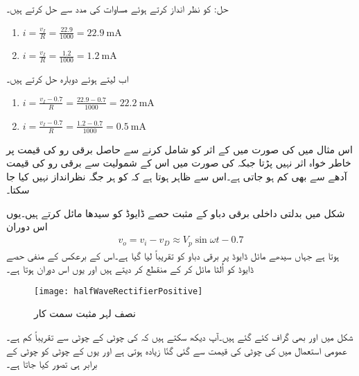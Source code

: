 حل:	 کو نظر انداز کرتے ہوئے مساوات   کی مدد سے حل کرتے ہیں۔
\begin{enumerate}
\item
$i=\frac{v_I}{R}=\frac{22.9}{1000}=\SI{22.9}{\milli \ampere}$
\item
$i=\frac{v_I}{R}=\frac{1.2}{1000}=\SI{1.2}{\milli \ampere}$
\end{enumerate}
اب  لیتے ہوئے دوبارہ حل کرتے ہیں۔
\begin{enumerate}
\item
$i=\frac{v_I-0.7}{R}=\frac{22.9-0.7}{1000}=\SI{22.2}{\milli \ampere}$
\item
$i=\frac{v_I-0.7}{R}=\frac{1.2-0.7}{1000}=\SI{0.5}{\milli \ampere}$
\end{enumerate}


اس مثال میں  کی صورت میں  کے اثر کو شامل کرنے سے حاصل برقی رو   کی قیمت پر خاطر خواہ اثر نہیں پڑتا جبکہ کی صورت میں اس کے شمولیت سے برقی رو کی قیمت آدھے سے بھی کم ہو جاتی ہے۔اس سے ظاہر ہوتا ہے کہ  کو ہر جگہ نظرانداز نہیں کیا جا سکتا۔

 
	شکل   میں بدلتی داخلی برقی دباو   کے مثبت حصے ڈایوڈ  کو سیدھا مائل کرتے ہیں۔یوں اس دوران
\begin{align*}
v_o = v_i  - v_D \approx V_p \sin \omega t  - 0.7
\end{align*}
ہوتا ہے جہاں سیدھے مائل ڈایوڈ پر برقی دباو کو تقریباً  لیا گیا ہے۔اس کے برعکس   کے منفی حصے ڈایوڈ کو اُلٹا مائل کر کے منقطع کر دیتے ہیں اور یوں اس دوران   ہوتا ہے۔
\begin{figure}
\centering
\texttt{[image: halfWaveRectifierPositive]}
\caption{نصف لہر مثبت سمت کار}
\label{شکل_نصف_لہر_مثبت_سمت_کار}
\end{figure}
شکل  میں   اور  بھی گراف کئے گئے ہیں۔آپ دیکھ سکتے ہیں کہ   کی چوٹی  کے چوٹی سے تقریباً  کم ہے۔عمومی استعمال میں  کی چوٹی کی قیمت  سے گئی گنّا زیادہ ہوتی ہے اور یوں  کے چوٹی کو  چوٹی کے برابر ہی تصور کیا جاتا ہے۔

